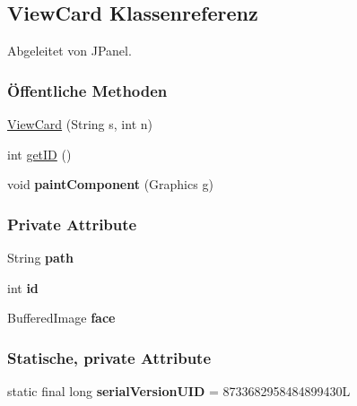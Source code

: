 \hypertarget{a00022}{\subsection{View\-Card Klassenreferenz}
\label{a00022}
}


Abgeleitet von J\-Panel.

\subsubsection*{Öffentliche Methoden}
\begin{DoxyCompactItemize}
\item 
\hyperlink{a00022_a682302cb58c058e170ea714a45c2342c}{View\-Card} (String s, int n)
\item 
int \hyperlink{a00022_aea93026f92028ac88f6b60cd2f3e438b}{get\-I\-D} ()
\item 
\hypertarget{a00022_aac9233d06f3c093fc37139d7d2b258f6}{void {\bfseries paint\-Component} (Graphics g)}\label{a00022_aac9233d06f3c093fc37139d7d2b258f6}

\end{DoxyCompactItemize}
\subsubsection*{Private Attribute}
\begin{DoxyCompactItemize}
\item 
\hypertarget{a00022_adb85e16ac8c9f62df2d33b1262649843}{String {\bfseries path}}\label{a00022_adb85e16ac8c9f62df2d33b1262649843}

\item 
\hypertarget{a00022_a7441ef0865bcb3db9b8064dd7375c1ea}{int {\bfseries id}}\label{a00022_a7441ef0865bcb3db9b8064dd7375c1ea}

\item 
\hypertarget{a00022_a9d8fedf4068416562cae5761080e4792}{Buffered\-Image {\bfseries face}}\label{a00022_a9d8fedf4068416562cae5761080e4792}

\end{DoxyCompactItemize}
\subsubsection*{Statische, private Attribute}
\begin{DoxyCompactItemize}
\item 
\hypertarget{a00022_a3238d314ecdee14d2966760945d00c3b}{static final long {\bfseries serial\-Version\-U\-I\-D} = 8733682958484899430\-L}\label{a00022_a3238d314ecdee14d2966760945d00c3b}

\end{DoxyCompactItemize}


